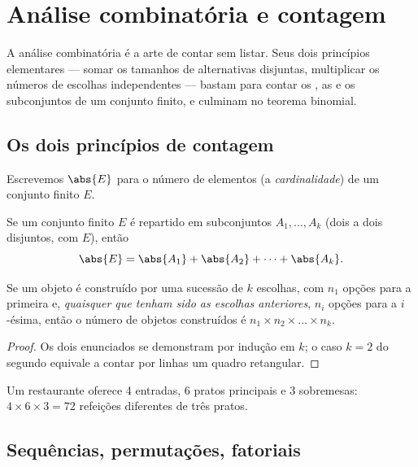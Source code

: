 \chapter{Análise combinatória e contagem}\label{ch:g12:comb}

A análise combinatória é a arte de contar sem listar. Seus dois princípios
elementares --- somar os tamanhos de alternativas disjuntas, multiplicar os
números de escolhas independentes --- bastam para contar os , as
 e os subconjuntos de um conjunto finito, e culminam no teorema
binomial.

\section{Os dois princípios de contagem}

Escrevemos $\abs{E}$ para o número de elementos (a \emph{cardinalidade}) de
um conjunto finito $E$.

\begin{proposition}\label{prop:g12:comb:addition}
Se um conjunto finito $E$ é repartido em subconjuntos $A_1, \dots, A_k$
(dois a dois disjuntos, com  $E$), então
\[
\abs{E} = \abs{A_1} + \abs{A_2} + \dots + \abs{A_k}.
\]
\end{proposition}

\begin{proposition}\label{prop:g12:comb:multiplication}
Se um objeto é construído por uma sucessão de $k$ escolhas, com $n_1$
opções para a primeira e, \emph{quaisquer que tenham sido as escolhas
anteriores}, $n_i$ opções para a $i$-ésima, então o número de objetos
construídos é $n_1 \times n_2 \times \dots \times n_k$.
\end{proposition}

\begin{proof}
Os dois enunciados se demonstram por indução em $k$; o caso $k = 2$ do
segundo equivale a contar por linhas um quadro retangular.
\end{proof}

\begin{example}
Um restaurante oferece 4 entradas, 6 pratos principais e 3 sobremesas:
$4 \times 6 \times 3 = 72$ refeições diferentes de três pratos.
\end{example}

\section{Sequências, permutações, fatoriais}

